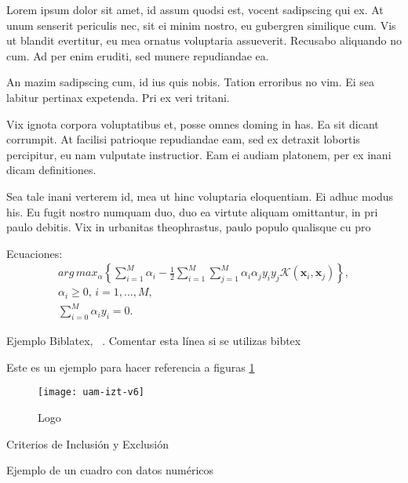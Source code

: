 Lorem ipsum dolor sit amet, id assum quodsi est, vocent sadipscing qui ex. At unum senserit periculis nec, sit ei minim nostro, eu gubergren similique cum. Vis ut blandit evertitur, eu mea ornatus voluptaria assueverit. Recusabo aliquando no cum. Ad per enim eruditi, sed munere repudiandae ea.

An mazim sadipscing cum, id ius quis nobis. Tation erroribus no vim. Ei sea labitur pertinax expetenda. Pri ex veri tritani.

Vix ignota corpora voluptatibus et, posse omnes doming in has. Ea sit dicant corrumpit. At facilisi patrioque repudiandae eam, sed ex detraxit lobortis percipitur, eu nam vulputate instructior. Eam ei audiam platonem, per ex inani dicam definitiones.

Sea tale inani verterem id, mea ut hinc voluptaria eloquentiam. Ei adhuc modus his. Eu fugit nostro numquam duo, duo ea virtute aliquam omittantur, in pri paulo debitis. Vix in urbanitas theophrastus, paulo populo qualisque cu pro~\cite{Ahangi2012,Akram2014,Akram2015}

Ecuaciones:
\begin{eqnarray}
  arg\, max_\alpha\left\{ \sum_{i=1}^M \alpha_i - \frac{1}{2} \sum_{i=1}^M\sum_{j=1}^M \alpha_i\alpha_j y_i y_j \mathcal{K}(\textbf{x}_i,\textbf{x}_j)\right\},\label{ec:svmdual}\\
  \alpha_i \geq 0,\, i=1,...,M, \nonumber\\
  \sum_{i=0}^M \alpha_i y_i=0. \nonumber
\end{eqnarray}

Ejemplo Biblatex, \textcite{Akram2014}~\citeyear{Akram2014}. Comentar esta línea si se utilizas bibtex

Este es un ejemplo para hacer referencia a figuras \fig\ref{fig:logo_uam}

\begin{figure}[ht]
  \centering
  \texttt{[image: uam-izt-v6]}
  \caption{Logo}
  \label{fig:logo_uam}
\end{figure}

\begin{table}
  \centering
  \caption{Criterios de Inclusión y Exclusión}\label{cdr:example}
    
\end{table}

\begin{table}
  \centering
  \caption{Ejemplo de un cuadro con datos numéricos}\label{cdr:num:example}
    
\end{table}